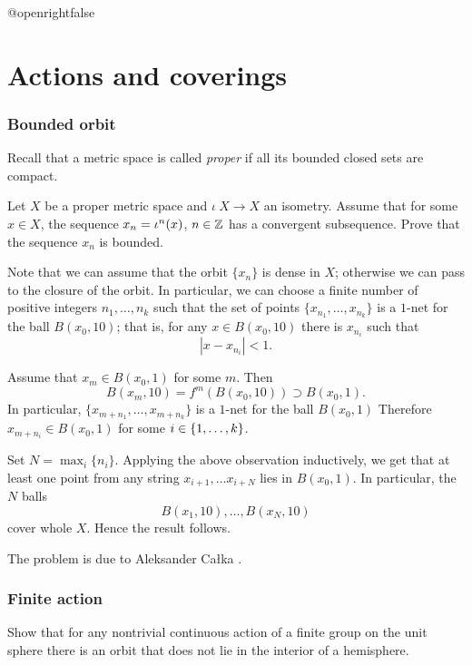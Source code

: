 \csname @openrightfalse\endcsname
\chapter{Actions and coverings}

\subsection*{Bounded orbit}
\label{Bounded orbit}

Recall that a metric space is called \emph{proper} if all its bounded closed sets are compact.

\begin{pr} Let $X$ be a 
proper metric space 
and $\iota\:X\to X$ an isometry.
Assume that for some $x\in X$, the sequence $x_n\z=\iota^n(x)$, $n\in\mathbb{Z}$ has a convergent subsequence.
Prove that the sequence $x_n$ is bounded.
\end{pr}

Note that we can assume that the orbit $\{x_n\}$ is dense in $X$;
otherwise we can pass to the closure of the orbit.
In particular, we can choose a finite number of positive integers $n_1,\dots,n_k$
such that the set of points $\{x_{n_1},\dots,x_{n_k}\}$ is a $1$-net for the ball $B(x_0,10)$;
that is, for any $x\in B(x_0,10)$ there is $x_{n_i}$ such that
\[|x-x_{n_i}|<1.\]

Assume that $x_m\in B(x_0,1)$ for some $m$.
Then 
\[B(x_m,10)=f^m( B(x_0,10))\supset B(x_0,1).\] 
In particular, $\{x_{m+n_1},\dots,x_{m+n_k}\}$ is a $1$-net for the ball $B(x_0,1)$
Therefore $x_{m+n_i}\in B(x_0,1)$ for some $i\z\in\{1,\dots,k\}$.

Set $N=\max_i\{n_i\}$.
Applying the above observation inductively, we get that at least one point from any string $x_{i+1},\dots x_{i+N}$ lies in $B(x_0,1)$.
In particular, the $N$ balls
\[B(x_1,10),\dots,B(x_N,10)\]
cover whole $X$.
Hence the result follows.\qeds

The problem is due to Aleksander Ca{\l}ka \cite{calka}.

\subsection*{Finite action}\label{Finite action}

\begin{pr}
Show that for any nontrivial continuous action of a finite group on the unit sphere
there is an orbit that does not lie in the interior of a hemisphere.
\end{pr}

